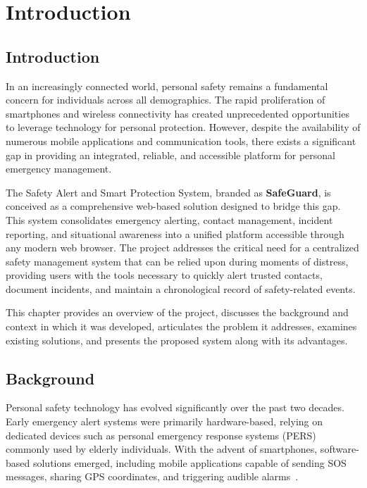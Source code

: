 \chapter{Introduction}

\section{Introduction}

In an increasingly connected world, personal safety remains a fundamental concern for individuals across all demographics. The rapid proliferation of smartphones and wireless connectivity has created unprecedented opportunities to leverage technology for personal protection. However, despite the availability of numerous mobile applications and communication tools, there exists a significant gap in providing an integrated, reliable, and accessible platform for personal emergency management.

The Safety Alert and Smart Protection System, branded as \textbf{SafeGuard}, is conceived as a comprehensive web-based solution designed to bridge this gap. This system consolidates emergency alerting, contact management, incident reporting, and situational awareness into a unified platform accessible through any modern web browser. The project addresses the critical need for a centralized safety management system that can be relied upon during moments of distress, providing users with the tools necessary to quickly alert trusted contacts, document incidents, and maintain a chronological record of safety-related events.

This chapter provides an overview of the project, discusses the background and context in which it was developed, articulates the problem it addresses, examines existing solutions, and presents the proposed system along with its advantages.

\section{Background}

Personal safety technology has evolved significantly over the past two decades. Early emergency alert systems were primarily hardware-based, relying on dedicated devices such as personal emergency response systems (PERS) commonly used by elderly individuals. With the advent of smartphones, software-based solutions emerged, including mobile applications capable of sending SOS messages, sharing GPS coordinates, and triggering audible alarms~\cite{b2020mobile}.

